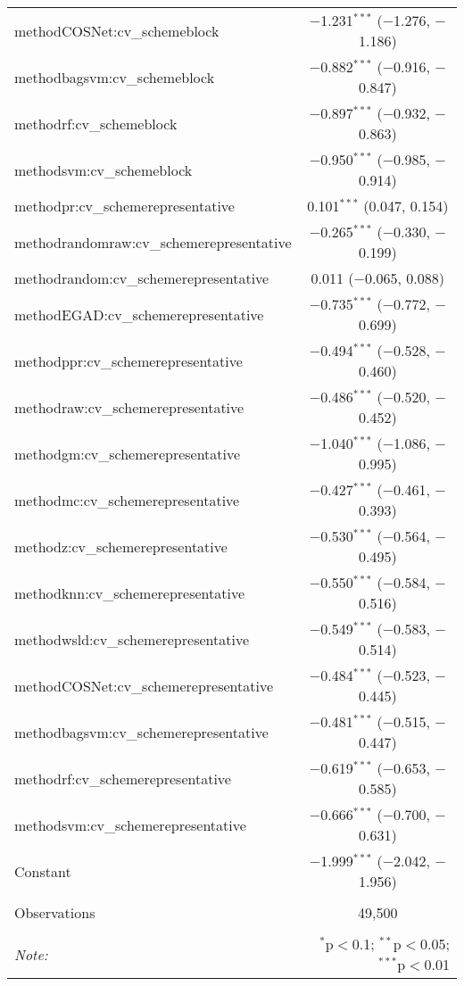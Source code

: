 \begin{table}[!htbp]
\begin{tabular}{@{\extracolsep{5pt}}lc}
  methodCOSNet:cv\_schemeblock & $-$1.231$^{***}$ ($-$1.276, $-$1.186) \\ 
  methodbagsvm:cv\_schemeblock & $-$0.882$^{***}$ ($-$0.916, $-$0.847) \\ 
  methodrf:cv\_schemeblock & $-$0.897$^{***}$ ($-$0.932, $-$0.863) \\ 
  methodsvm:cv\_schemeblock & $-$0.950$^{***}$ ($-$0.985, $-$0.914) \\ 
  methodpr:cv\_schemerepresentative & 0.101$^{***}$ (0.047, 0.154) \\ 
  methodrandomraw:cv\_schemerepresentative & $-$0.265$^{***}$ ($-$0.330, $-$0.199) \\ 
  methodrandom:cv\_schemerepresentative & 0.011 ($-$0.065, 0.088) \\ 
  methodEGAD:cv\_schemerepresentative & $-$0.735$^{***}$ ($-$0.772, $-$0.699) \\ 
  methodppr:cv\_schemerepresentative & $-$0.494$^{***}$ ($-$0.528, $-$0.460) \\ 
  methodraw:cv\_schemerepresentative & $-$0.486$^{***}$ ($-$0.520, $-$0.452) \\ 
  methodgm:cv\_schemerepresentative & $-$1.040$^{***}$ ($-$1.086, $-$0.995) \\ 
  methodmc:cv\_schemerepresentative & $-$0.427$^{***}$ ($-$0.461, $-$0.393) \\ 
  methodz:cv\_schemerepresentative & $-$0.530$^{***}$ ($-$0.564, $-$0.495) \\ 
  methodknn:cv\_schemerepresentative & $-$0.550$^{***}$ ($-$0.584, $-$0.516) \\ 
  methodwsld:cv\_schemerepresentative & $-$0.549$^{***}$ ($-$0.583, $-$0.514) \\ 
  methodCOSNet:cv\_schemerepresentative & $-$0.484$^{***}$ ($-$0.523, $-$0.445) \\ 
  methodbagsvm:cv\_schemerepresentative & $-$0.481$^{***}$ ($-$0.515, $-$0.447) \\ 
  methodrf:cv\_schemerepresentative & $-$0.619$^{***}$ ($-$0.653, $-$0.585) \\ 
  methodsvm:cv\_schemerepresentative & $-$0.666$^{***}$ ($-$0.700, $-$0.631) \\ 
  Constant & $-$1.999$^{***}$ ($-$2.042, $-$1.956) \\ 
 \hline \\[-1.8ex] 
Observations & 49,500 \\ 
\hline 
\hline \\[-1.8ex] 
\textit{Note:}  & \multicolumn{1}{r}{$^{*}$p$<$0.1; $^{**}$p$<$0.05; $^{***}$p$<$0.01} \\ 
\end{tabular} 
\end{table} 
